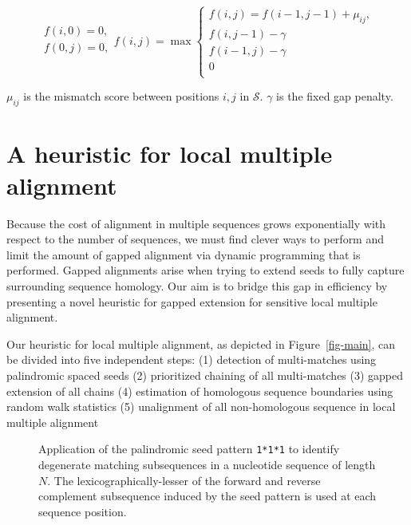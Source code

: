\documentclass[twoside,11pt]{article}
\begin{document}
$$
\begin{array}{l}
f(i,0) = 0,\\
f(0,j) = 0,\\
\end{array}
f(i,j)= \max\left\{\begin{array}{l}
f(i,j) = f(i-1,j-1)+\mu_{ij},\\
f(i,j-1) - \gamma\\
f(i-1,j)-\gamma\\
0 \\
\end{array}\right.
$$
\begin{center}
$\mu_{ij}$ is the mismatch score between positions $i,j$ in $\mathcal{S}$.  $\gamma$ is the fixed gap penalty.
\end{center}

\section{A heuristic for local multiple alignment}
Because the cost of alignment in multiple sequences grows exponentially with respect to the number of sequences, we must find clever ways to perform and limit the amount of gapped alignment via dynamic programming that is performed. Gapped alignments arise when trying to extend seeds to fully capture surrounding sequence homology. Our aim is to bridge this gap in efficiency by presenting a novel heuristic for gapped extension for sensitive local multiple alignment.

Our heuristic for local multiple alignment, as depicted in Figure~\ref{fig-main},
can be divided into five independent steps:
(1) detection of multi-matches using palindromic spaced seeds
(2) prioritized chaining of all multi-matches
(3) gapped extension of all chains
(4) estimation of homologous sequence boundaries using random walk statistics
(5) unalignment of all non-homologous sequence in local multiple alignment

\begin{figure}[t]
\centering {}
\caption{Application of the palindromic seed pattern
\texttt{1*1*1} to identify degenerate matching subsequences in a
nucleotide sequence of length $N$. The lexicographically-lesser of
the forward and reverse complement subsequence induced by the seed
pattern is used at each sequence position.}

\label{fig-seeds}\vspace{-0.2cm}
\end{figure}
\end{document}
